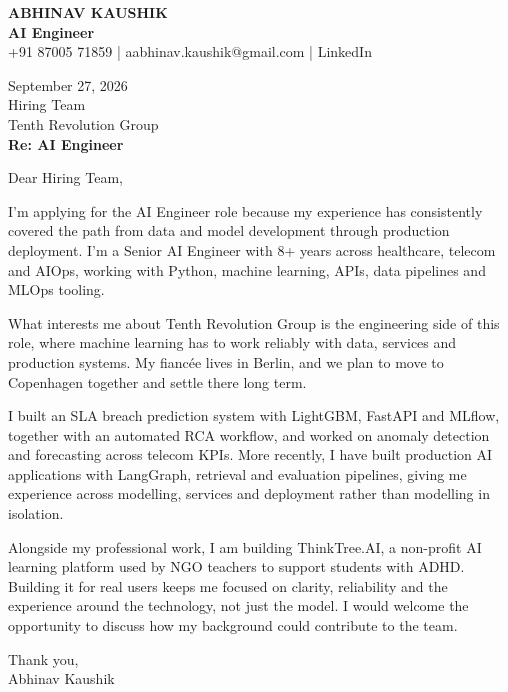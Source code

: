 \documentclass[10pt,a4paper]{article}
\begin{document}
\begin{center}
{\Large\bfseries ABHINAV KAUSHIK}\\[2pt]
{\bfseries AI Engineer}\\[2pt]
+91 87005 71859 \quad | \quad aabhinav.kaushik@gmail.com \quad | \quad LinkedIn
\end{center}
\vspace{8pt}
September 27, 2026\\[6pt]
Hiring Team\\
Tenth Revolution Group\\[4pt]
\textbf{Re: AI Engineer}

Dear Hiring Team,

I’m applying for the AI Engineer role because my experience has consistently covered the path from data and model development through production deployment. I’m a Senior AI Engineer with 8+ years across healthcare, telecom and AIOps, working with Python, machine learning, APIs, data pipelines and MLOps tooling.

What interests me about Tenth Revolution Group is the engineering side of this role, where machine learning has to work reliably with data, services and production systems. My fiancée lives in Berlin, and we plan to move to Copenhagen together and settle there long term.

I built an SLA breach prediction system with LightGBM, FastAPI and MLflow, together with an automated RCA workflow, and worked on anomaly detection and forecasting across telecom KPIs. More recently, I have built production AI applications with LangGraph, retrieval and evaluation pipelines, giving me experience across modelling, services and deployment rather than modelling in isolation.

Alongside my professional work, I am building ThinkTree.AI, a non-profit AI learning platform used by NGO teachers to support students with ADHD. Building it for real users keeps me focused on clarity, reliability and the experience around the technology, not just the model. I would welcome the opportunity to discuss how my background could contribute to the team.

Thank you,\\
Abhinav Kaushik
\end{document}
